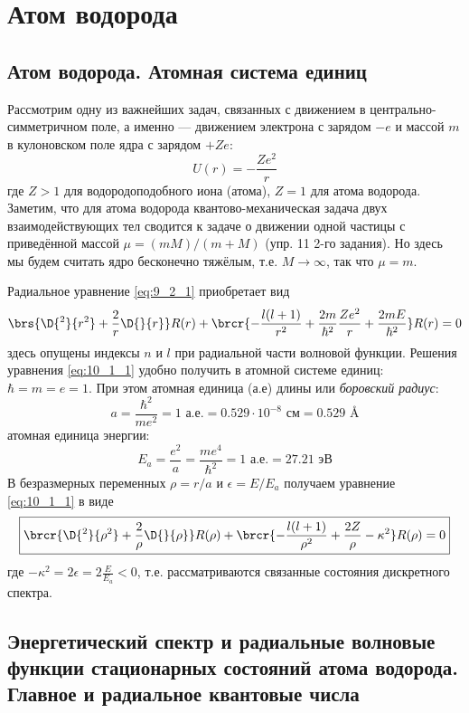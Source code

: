 \chapter{Атом водорода}

\section{Атом водорода. Атомная система единиц}

Рассмотрим одну из важнейших задач, связанных с движением в центрально-симметричном поле, а именно — движением электрона с зарядом $-e$ и массой $m$ в кулоновском поле ядра с зарядом $+Ze$:
$$
U(r) = -\frac{Ze^2}{r}
$$%
%
где $Z>1$ для водородоподобного иона (атома), $Z=1$ для атома водорода. Заметим, что для атома водорода квантово-механическая задача двух взаимодействующих тел сводится к задаче о движении одной частицы с приведённой массой $\mu = (m M)/(m + M)$ (упр. 11 2-го задания). Но здесь мы будем считать ядро бесконечно тяжёлым, т.е. $M \to \infty$, так что $\mu = m$.

Радиальное уравнение \eqref{eq:9_2_1} приобретает вид
\begin{equation}
\label{eq:10_1_1}
\brs{\D{^2}{r^2} + \frac{2}{r}\D{}{r}} R(r) + 
\brcr{-\frac{l(l+1)}{r^2} + \frac{2m}{\hbar^2}\frac{Ze^2}{r} + \frac{2mE}{\hbar^2}} R(r) = 0
\end{equation}%
%
здесь опущены индексы $n$ и $l$ при радиальной части волновой функции. Решения уравнения \eqref{eq:10_1_1} удобно получить в атомной системе единиц: $\hbar = m = e = 1$. При этом атомная единица (а.е) длины или {\em боровский радиус}:
$$
a = \frac{\hbar^2}{me^2} = 1\text{~а.е.} = 0.529 \cdot 10^{-8} \text{~см} = 0.529 \text{~\AA}
$$%
%
атомная единица энергии:
$$
E_a = \frac{e^2}{a} = \frac{me^4}{\hbar^2} = 1 \text{~а.е.} = 27.21 \text{~эВ}
$$%
%
В безразмерных переменных $\rho = r/a$ и $\epsilon = E/E_a$ получаем уравнение \eqref{eq:10_1_1} в виде
\begin{equation}
\label{eq:10_1_2}
\boxed{
	\brcr{\D{^2}{\rho^2} + \frac{2}{\rho} \D{}{\rho}} R(\rho) + \brcr{-\frac{l(l+1)}{\rho^2} + \frac{2Z}{\rho} - \kappa^2} R(\rho) = 0
}
\end{equation}%
%
где $-\kappa^2 = 2 \epsilon = 2 \frac{E}{E_a} < 0$, т.е. рассматриваются связанные состояния дискретного спектра.

\section{Энергетический спектр и радиальные волновые функции стационарных состояний атома водорода. Главное и радиальное квантовые числа}


